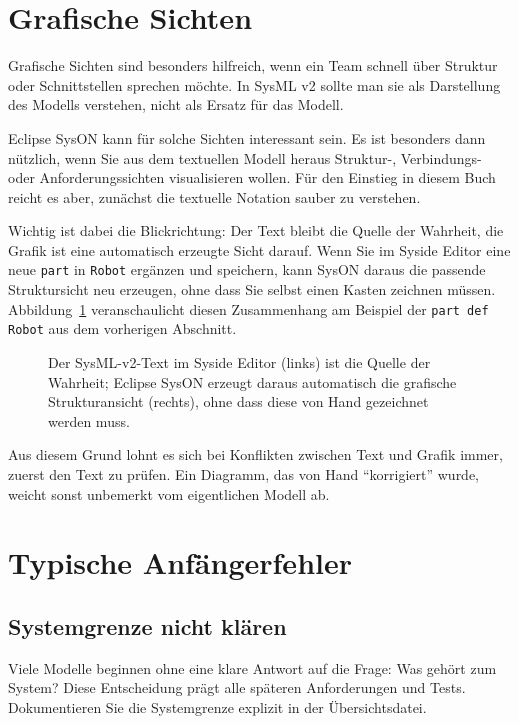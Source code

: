 \section{Grafische Sichten}
Grafische Sichten sind besonders hilfreich, wenn ein Team schnell über Struktur oder Schnittstellen sprechen möchte. In SysML v2 sollte man sie als Darstellung des Modells verstehen, nicht als Ersatz für das Modell.

Eclipse SysON kann für solche Sichten interessant sein. Es ist besonders dann nützlich, wenn Sie aus dem textuellen Modell heraus Struktur-, Verbindungs- oder Anforderungssichten visualisieren wollen. Für den Einstieg in diesem Buch reicht es aber, zunächst die textuelle Notation sauber zu verstehen.

Wichtig ist dabei die Blickrichtung: Der Text bleibt die Quelle der Wahrheit, die Grafik ist eine automatisch erzeugte Sicht darauf. Wenn Sie im Syside Editor eine neue \texttt{part} in \texttt{Robot} ergänzen und speichern, kann SysON daraus die passende Struktursicht neu erzeugen, ohne dass Sie selbst einen Kasten zeichnen müssen. Abbildung~\ref{fig:kap04-syside-syson-sync} veranschaulicht diesen Zusammenhang am Beispiel der \texttt{part def Robot} aus dem vorherigen Abschnitt.

\begin{figure}[H]
  \centering
  \caption{Der SysML-v2-Text im Syside Editor (links) ist die Quelle der Wahrheit; Eclipse SysON erzeugt daraus automatisch die grafische Strukturansicht (rechts), ohne dass diese von Hand gezeichnet werden muss.}
  \label{fig:kap04-syside-syson-sync}
\end{figure}

\begin{hinweisbox}
Aus diesem Grund lohnt es sich bei Konflikten zwischen Text und Grafik immer, zuerst den Text zu prüfen. Ein Diagramm, das von Hand \enquote{korrigiert} wurde, weicht sonst unbemerkt vom eigentlichen Modell ab.
\end{hinweisbox}

\section{Typische Anfängerfehler}
\subsection{Systemgrenze nicht klären}
Viele Modelle beginnen ohne eine klare Antwort auf die Frage: Was gehört zum System? Diese Entscheidung prägt alle späteren Anforderungen und Tests. Dokumentieren Sie die Systemgrenze explizit in der Übersichtsdatei.

